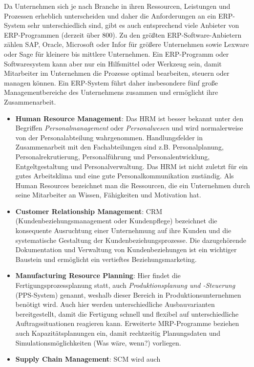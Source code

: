 \documentclass[a4paper, 12pt]{report}
\begin{document}
\begin{multicols}{2}
Da Unternehmen sich je nach Branche in ihren Ressourcen, Leistungen und
Prozessen erheblich unterscheiden und daher die Anforderungen an ein ERP-System
sehr unterschiedlich sind, gibt es auch entsprechend viele Anbieter von
ERP-Programmen (derzeit über 800). Zu den größten ERP-Software-Anbietern zählen
SAP, Oracle, Microsoft oder Infor für größere Unternehmen sowie Lexware oder
Sage für kleinere bis mittlere Unternehmen. Ein ERP-Programm oder Softwaresystem
kann aber nur ein Hilfsmittel oder Werkzeug sein, damit Mitarbeiter im
Unternehmen die Prozesse optimal bearbeiten, steuern oder managen können. Ein
ERP-System führt daher insbesondere fünf große Managementbereiche des
Unternehmens zusammen und ermöglicht ihre Zusammenarbeit.

\begin{itemize}
    \item \textbf{Human Resource Management}: Das HRM ist besser bekannt unter
	den Begriffen \emph{Personalmanagement} oder \emph{Personalwesen} und
	wird normalerweise von der Personalabteilung wahrgenommen.
	Handlungsfelder in Zusammenarbeit mit den Fachabteilungen sind z.B.
	Personalplanung, Personalrekrutierung, Personalführung und
	Personalentwicklung, Entgeltgestaltung und Personalverwaltung. Das HRM
	ist nicht zuletzt für ein gutes Arbeitsklima und eine gute
	Personalkommunikation zuständig. Als Human Resources bezeichnet man die
	Ressourcen, die ein Unternehmen durch seine Mitarbeiter an Wissen,
	Fähigkeiten und Motivation hat.
    \item \textbf{Customer Relationship Management}: CRM
	(Kundenbeziehungsmanagement oder Kundenpflege) bezeichnet die
	konsequente Ausruchtung einer Unternehmung auf ihre Kunden und die
	systematische Gestaltung der Kundenbeziehungsprozesse. Die dazugehörende
	Dokumentation und Verwaltung von Kundenbeziehungen ist ein wichtiger
	Baustein und ermöglicht ein vertieftes Beziehungsmarketing.
    \item \textbf{Manufacturing Resource Planning}: Hier findet die
	Fertigungsprozessplanung statt, auch \emph{Produktionsplanung und
	-Steuerung} (PPS-System) genannt, weshalb dieser Bereich in
	Produktionsunternehmen benötigt wird. Auch hier werden unterschiedliche
	Ausbauvarianten bereitgestellt, damit die Fertigung schnell und flexibel
	auf unterschiedliche Auftragssituationen reagieren kann. Erweiterte
	MRP-Programme beziehen auch Kapazitätsplanungen ein, damit rechtzeitig
	Planungsdaten und Simulationsmöglichkeiten (Was wäre, wenn?) vorliegen.
    \item \textbf{Supply Chain Management}: SCM wird auch

\end{itemize}
\end{multicols}
\end{document}
